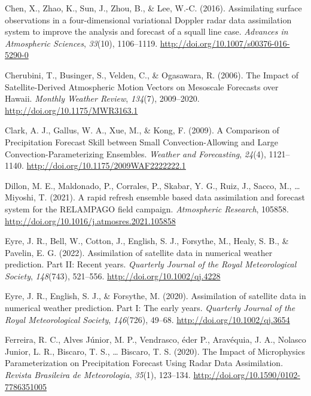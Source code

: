 \documentclass[12pt,twoside]{reedthesis}
\begin{document}
\leavevmode\hypertarget{ref-chen2016}{}%
Chen, X., Zhao, K., Sun, J., Zhou, B., \& Lee, W.-C. (2016). Assimilating surface observations in a four-dimensional variational Doppler radar data assimilation system to improve the analysis and forecast of a squall line case. \emph{Advances in Atmospheric Sciences}, \emph{33}(10), 1106--1119. \url{http://doi.org/10.1007/s00376-016-5290-0}

\leavevmode\hypertarget{ref-cherubini2006}{}%
Cherubini, T., Businger, S., Velden, C., \& Ogasawara, R. (2006). The Impact of Satellite-Derived Atmospheric Motion Vectors on Mesoscale Forecasts over Hawaii. \emph{Monthly Weather Review}, \emph{134}(7), 2009--2020. \url{http://doi.org/10.1175/MWR3163.1}

\leavevmode\hypertarget{ref-clark2009}{}%
Clark, A. J., Gallus, W. A., Xue, M., \& Kong, F. (2009). A Comparison of Precipitation Forecast Skill between Small Convection-Allowing and Large Convection-Parameterizing Ensembles. \emph{Weather and Forecasting}, \emph{24}(4), 1121--1140. \url{http://doi.org/10.1175/2009WAF2222222.1}

\leavevmode\hypertarget{ref-dillon2021}{}%
Dillon, M. E., Maldonado, P., Corrales, P., Skabar, Y. G., Ruiz, J., Sacco, M., \ldots{} Miyoshi, T. (2021). A rapid refresh ensemble based data assimilation and forecast system for the RELAMPAGO field campaign. \emph{Atmospheric Research}, 105858. \url{http://doi.org/10.1016/j.atmosres.2021.105858}

\leavevmode\hypertarget{ref-eyre2022}{}%
Eyre, J. R., Bell, W., Cotton, J., English, S. J., Forsythe, M., Healy, S. B., \& Pavelin, E. G. (2022). Assimilation of satellite data in numerical weather prediction. Part II: Recent years. \emph{Quarterly Journal of the Royal Meteorological Society}, \emph{148}(743), 521--556. \url{http://doi.org/10.1002/qj.4228}

\leavevmode\hypertarget{ref-eyre2020}{}%
Eyre, J. R., English, S. J., \& Forsythe, M. (2020). Assimilation of satellite data in numerical weather prediction. Part I: The early years. \emph{Quarterly Journal of the Royal Meteorological Society}, \emph{146}(726), 49--68. \url{http://doi.org/10.1002/qj.3654}

\leavevmode\hypertarget{ref-ferreira2020}{}%
Ferreira, R. C., Alves Júnior, M. P., Vendrasco, éder P., Aravéquia, J. A., Nolasco Junior, L. R., Biscaro, T. S., \ldots{} Biscaro, T. S. (2020). The Impact of Microphysics Parameterization on Precipitation Forecast Using Radar Data Assimilation. \emph{Revista Brasileira de Meteorologia}, \emph{35}(1), 123--134. \url{http://doi.org/10.1590/0102-7786351005}
\end{document}

